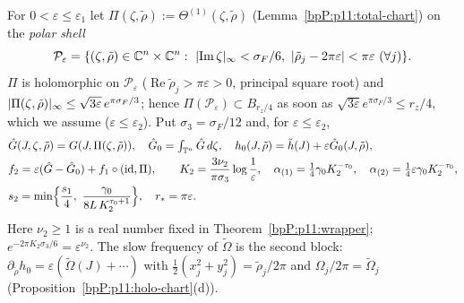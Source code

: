 
For $0<\varepsilon\le\varepsilon_1$ let $\Pi(\zeta,\tilde\rho):=\Theta^{(1)}(\zeta,\tilde\rho)$ (Lemma~\ref{bpP:p11:total-chart}) on the \emph{polar shell}
\[\mathcal P_\varepsilon=\{(\zeta,\tilde\rho)\in\C^n\times\C^n:\ \abs{\operatorname{Im}\zeta}_\infty<\sigma_F/6,\ \abs{\tilde\rho_j-2\pi\varepsilon}<\pi\varepsilon\ (\forall j)\}.\]
$\Pi$ is holomorphic on $\mathcal P_\varepsilon$ ($\operatorname{Re}\tilde\rho_j>\pi\varepsilon>0$, principal square root) and $\lvert \Pi(\zeta,\tilde\rho)\rvert_\infty\le\sqrt{3\varepsilon}\,e^{\pi\sigma_F/3}$; hence $\Pi(\mathcal P_\varepsilon)\subset B_{r_z/4}$ as soon as $\sqrt{3\varepsilon}e^{\pi\sigma_F/3}\le r_z/4$, which we assume ($\varepsilon\le\varepsilon_2$). Put $\sigma_3=\sigma_F/12$ and, for $\varepsilon\le\varepsilon_2$,
\begin{equation}\label{bpP:p11:eq:par2}
\begin{aligned}
&\hat G(J,\zeta,\tilde\rho)=G(J,\Pi(\zeta,\tilde\rho)),\quad\hat G_0=\textstyle\int_{\T^n}\hat G\,d\zeta,\quad h_0(J,\tilde\rho)=\tilde h(J)+\varepsilon\hat G_0(J,\tilde\rho),\\ &f_2=\varepsilon(\hat G-\hat G_0)+f_1\circ(\mathrm{id},\Pi),\qquad K_2=\frac{3\nu_2}{\pi\sigma_3}\log\frac1\varepsilon,\quad\alpha_{(1)}=\tfrac14\gamma_0K_2^{-\tau_0},\quad\alpha_{(2)}=\tfrac14\varepsilon\gamma_0K_2^{-\tau_0},\\ &s_2=\min\Bigl\{\frac{s_1}4,\ \frac{\gamma_0}{8L\,K_2^{\tau_0+1}}\Bigr\},\quad r_*=\pi\varepsilon .\\
\end{aligned}
\end{equation}
Here $\nu_2\ge1$ is a real number fixed in Theorem~\ref{bpP:p11:wrapper}; $e^{-2\pi K_2\sigma_3/6}=\varepsilon^{\nu_2}$. The slow frequency of $\tilde\Omega$ is the second block: $\partial_{\tilde\rho}h_0=\varepsilon(\tilde\Omega(J)+\cdots)$ with $\tfrac12(x_j^2+y_j^2)=\tilde\rho_j/2\pi$ and $\Omega_j/2\pi=\tilde\Omega_j$ (Proposition~\ref{bpP:p11:holo-chart}(d)).

